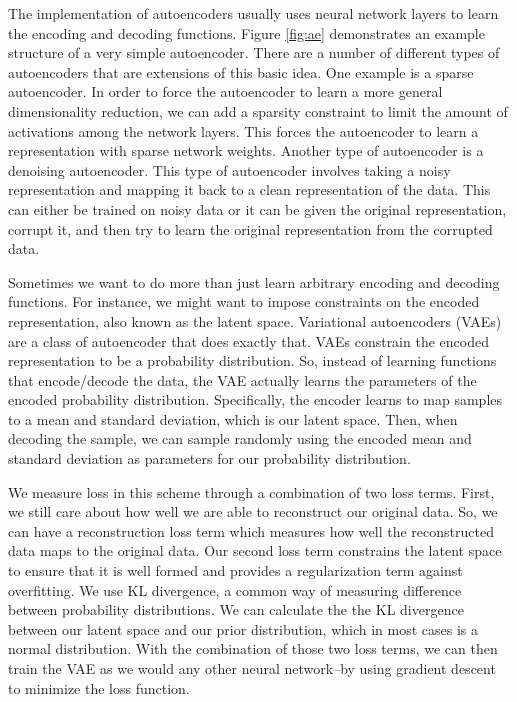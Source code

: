 The implementation of autoencoders usually uses neural network layers to learn the encoding and decoding functions.
Figure \ref{fig:ae} demonstrates an example structure of a very simple autoencoder.
There are a number of different types of autoencoders that are extensions of this basic idea.
One example is a sparse autoencoder.
In order to force the autoencoder to learn a more general dimensionality reduction, we can add a sparsity constraint to limit the amount of activations among the network layers.
This forces the autoencoder to learn a representation with sparse network weights.
Another type of autoencoder is a denoising autoencoder.
This type of autoencoder involves taking a noisy representation and mapping it back to a clean representation of the data.
This can either be trained on noisy data or it can be given the original representation, corrupt it, and then try to learn the original representation from the corrupted data.

Sometimes we want to do more than just learn arbitrary encoding and decoding functions.
For instance, we might want to impose constraints on the encoded representation, also known as the latent space.
Variational autoencoders (VAEs) are a class of autoencoder that does exactly that.
VAEs constrain the encoded representation to be a probability distribution.
So, instead of learning functions that encode/decode the data, the VAE actually learns the parameters of the encoded probability distribution.
Specifically, the encoder learns to map samples to a mean and standard deviation, which is our latent space.
Then, when decoding the sample, we can sample randomly using the encoded mean and standard deviation as parameters for our probability distribution.

We measure loss in this scheme through a combination of two loss terms.
First, we still care about how well we are able to reconstruct our original data.
So, we can have a reconstruction loss term which measures how well the reconstructed data maps to the original data.
Our second loss term constrains the latent space to ensure that it is well formed and provides a regularization term against overfitting.
We use KL divergence, a common way of measuring difference between probability distributions.
We can calculate the the KL divergence between our latent space and our prior distribution, which in most cases is a normal distribution.
With the combination of those two loss terms, we can then train the VAE as we would any other neural network--by using gradient descent to minimize the loss function.